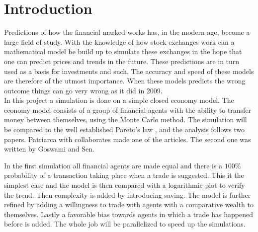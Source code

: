 \section{Introduction}

Predictions of how the financial marked works has, in the modern age, become a large field of study\cite{publisher}. With the knowledge of how stock exchanges work can a mathematical model be build up to simulate these exchanges in the hope that one can predict prices and trends in the future. These predictions are in turn used as a basis for investments and such. The accuracy and speed of these models are therefore of the utmost importance. When these models predicts the wrong outcome things can go very wrong as it did in 2009\cite{marketcrash}.\\

In this project a simulation is done on a simple closed economy model. The economy model consists of a group of financial agents with the ability to transfer money between themselves, using the Monte Carlo method. The simulation will be compared to the well established Pareto's law \cite{paretoslaw}, and the analysis follows two papers. Patriarca with collaborates made one of the articles.\cite{patriarca} The second one was written by Goswami and Sen. \cite{goswami}

In the first simulation all financial agents are made equal and there is a $100\%$ probability of a transaction taking place when a trade is suggested. This it the simplest case and the model is then compared with a logarithmic plot to verify the trend. Then complexity is added by introducing saving. The model is further refined by adding a willingness to trade with agents with a comparative wealth to themselves. Lastly a favorable bias towards agents in which a trade has happened before is added. The whole job will be parallelized to speed up the simulations.\\



















































